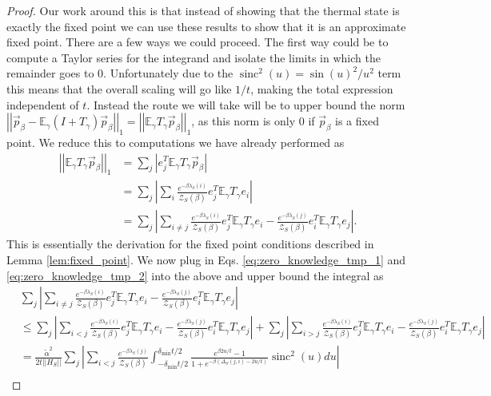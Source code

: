 \documentclass{article}
\newcommand{\abs}[1]{\left| #1 \right|}
\newcommand{\norm}[1]{\left|\left| #1 \right|\right|}
\newcommand{\EE}{\mathbb{E}}
\newcommand{\partfun}{\mathcal{Z}}
\DeclareMathOperator{\sinc}{sinc}
\begin{document}
\begin{proof}
    Our work around this is that instead of showing that the thermal state is exactly the fixed point we can use these results to show that it is an approximate fixed point. There are a few ways we could proceed. The first way could be to compute a Taylor series for the integrand and isolate the limits in which the remainder goes to 0. Unfortunately due to the $\sinc^2(u) = \sin(u)^2 / u^2$ term this means that the overall scaling will go like $1/t$, making the total expression independent of $t$. Instead the route we will take will be to upper bound the norm $\norm{\vec{p}_{\beta} - \EE_\gamma (I + T_\gamma)\vec{p}_\beta}_1 = \norm{\EE_\gamma T_\gamma \vec{p}_\beta}_1$, as this norm is only 0 if $\vec{p}_\beta$ is a fixed point. We reduce this to computations we have already performed as
    \begin{align}
        \norm{\EE_\gamma T_\gamma \vec{p}_\beta}_1 &= \sum_j \abs{e_j^T \EE_\gamma T_\gamma \vec{p}_\beta } \\
        &= \sum_j \abs{\sum_{i} \frac{e^{-\beta \lambda_S(i)}}{\partfun_S(\beta)} e_j^T \EE_\gamma T_\gamma e_i } \\
        &= \sum_j \abs{\sum_{i \neq j} \frac{e^{-\beta \lambda_S(i)}}{\partfun_S(\beta)} e_j^T \EE_\gamma T_\gamma e_i - \frac{e^{-\beta \lambda_S(j)}}{\partfun_S(\beta)} e_i^T \EE_\gamma T_\gamma e_j}.
    \end{align}
    This is essentially the derivation for the fixed point conditions described in Lemma \ref{lem:fixed_point}. We now plug in Eqs. \eqref{eq:zero_knowledge_tmp_1} and \eqref{eq:zero_knowledge_tmp_2} into the above and upper bound the integral as
    \begin{align}
        &\sum_j \abs{\sum_{i \neq j} \frac{e^{-\beta \lambda_S(i)}}{\partfun_S(\beta)} e_j^T \EE_\gamma T_\gamma e_i - \frac{e^{-\beta \lambda_S(j)}}{\partfun_S(\beta)} e_i^T \EE_\gamma T_\gamma e_j} \nonumber \\
        &\le \sum_j \abs{\sum_{i < j} \frac{e^{-\beta \lambda_S(i)}}{\partfun_S(\beta)} e_j^T \EE_\gamma T_\gamma e_i - \frac{e^{-\beta \lambda_S(j)}}{\partfun_S(\beta)} e_i^T \EE_\gamma T_\gamma e_j} + \sum_j  \abs{\sum_{i > j} \frac{e^{-\beta \lambda_S(i)}}{\partfun_S(\beta)} e_j^T \EE_\gamma T_\gamma e_i - \frac{e^{-\beta \lambda_S(j)}}{\partfun_S(\beta)} e_i^T \EE_\gamma T_\gamma e_j} \\
        &= \frac{\widetilde{\alpha}^2}{2 t \norm{H_S}} \sum_j \abs{\sum_{i < j} \frac{e^{-\beta \lambda_S(j)}}{\partfun_S(\beta)} \int_{-\delta_{\min} t /2 }^{\delta_{\min} t/ 2} \frac{ e^{\beta 2 u / t} - 1}{1 + e^{-\beta(\Delta_S(j, i) - 2u/t)}} \sinc^2(u) du} \nonumber \\

\end{align}
\end{proof}
\end{document}
